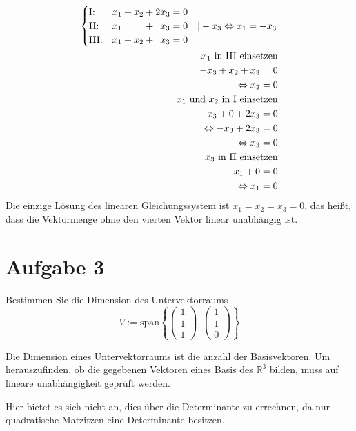 \begin{align*}
    \begin{cases}
        \text{I:\@} & x_1 + x_2 + 2x_3 = 0 \\
        \text{II:\@} & x_1 \phantom{{}+x_2} + \phantom{{}2}x_3 = 0 \quad | -x_3 \Leftrightarrow x_1 = -x_3\\
        \text{III:\@} & x_1 + x_2 + \phantom{{}2}x_3 = 0
    \end{cases} \\
    x_1 \text{ in III einsetzen} \\
    -x_3 + x_2 + x_3 = 0 \\ 
    \Leftrightarrow x_2 = 0 \\
    x_1 \text{ und } x_2 \text{ in I einsetzen} \\
    -x_3 + 0 + 2x_3 = 0 \\
    \Leftrightarrow -x_3 + 2x_3 = 0 \\
    \Leftrightarrow x_3 = 0 \\
    x_3 \text{ in II einsetzen}\\
    x_1 + 0 = 0 \\
    \Leftrightarrow x_1 = 0
\end{align*}
Die einzige Lösung des linearen Gleichungssystem ist $x_1 = x_2 = x_3 = 0$, das heißt, dass die Vektormenge ohne den vierten Vektor linear unabhängig ist.


\hrulefill{}
\section{Aufgabe 3}
Bestimmen Sie die Dimension des Untervektorraums
\[ V := \text{span}\left\{ \begin{pmatrix} 1 \\ 1 \\ 1 \end{pmatrix}, \begin{pmatrix} 1 \\ 1 \\ 0 \end{pmatrix} \right\} \]

Die Dimension eines Untervektorraums ist die anzahl der Basisvektoren. Um herauszufinden, ob die gegebenen Vektoren eines Basis des $\mathbb{R}^3$ bilden, muss auf lineare unabhängigkeit geprüft werden.

Hier bietet es sich nicht an, dies über die Determinante zu errechnen, da nur quadratische Matzitzen eine Determinante besitzen.

